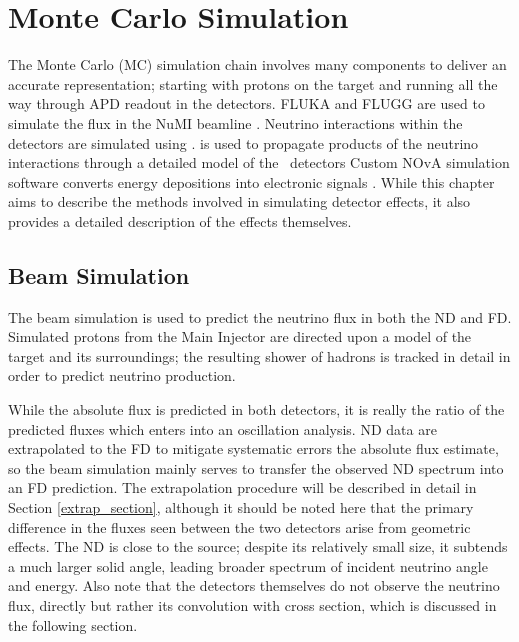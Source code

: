 \chapter{Monte Carlo Simulation}
\label{sim_chapter}


The \nova Monte Carlo (MC) simulation chain involves many components to deliver an accurate representation; starting with protons on the \numi target and running all the way through APD readout in the \nova detectors.  FLUKA and FLUGG are used to simulate the flux in the NuMI beamline \cite{fluka}.
Neutrino interactions within the detectors are simulated using \genie
\cite{genie}.
\geant is used to propagate products of the neutrino interactions through a detailed model of the \nova~detectors \cite{geant}
Custom NOvA simulation software converts energy depositions into electronic signals \cite{aurisano2015nova}.
While this chapter aims to describe the methods involved in simulating detector effects, it also provides a detailed description of the
effects themselves.


\section{Beam Simulation}
\label{beam_sim_section}

The \numi beam simulation is used to predict the neutrino flux
in both the ND and FD.
Simulated protons from the Main Injector are directed upon a model of the
target and its surroundings; the resulting shower of hadrons
is tracked in detail in order to predict neutrino production.

While the absolute flux is predicted in both detectors,
it is really the ratio of the predicted fluxes which enters into an oscillation
analysis.
ND data are extrapolated to the FD to mitigate systematic errors
the absolute flux estimate, so the beam simulation mainly serves
to transfer the observed ND spectrum into an FD prediction.
The extrapolation procedure will be described in detail in Section
\ref{extrap_section}, although it should be noted here that the primary
difference in the fluxes seen between the two detectors arise from geometric
effects.
The ND is close to the \numi source; despite its relatively small size,
it subtends a much larger solid angle, leading broader spectrum of incident
neutrino angle and energy.
Also note that the detectors themselves do not observe the neutrino flux,
directly but rather its convolution with cross section, which is discussed
in the following section.

